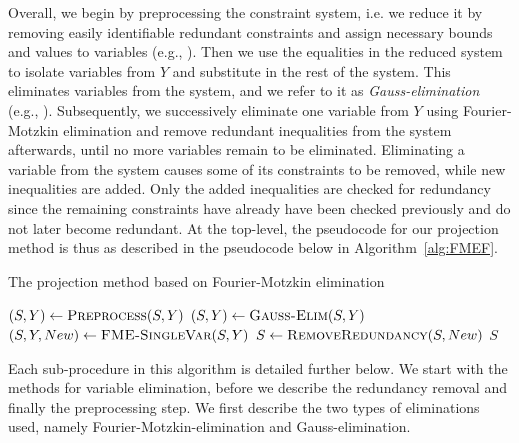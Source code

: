 Overall, we begin by preprocessing the constraint system, i.e. we reduce it by removing easily identifiable redundant constraints and assign necessary bounds and values to variables (e.g., \cite{brearley75,andersen95,maros}).
Then we use the equalities in the reduced system to isolate variables from $Y$ and substitute in the rest of the system. This eliminates variables from the system, and we refer to it as \emph{Gauss-elimination} (e.g., \cite{duffin74,simon05}).  
Subsequently, we successively eliminate one variable from $Y$ using Fourier-Motzkin elimination and remove redundant inequalities from the system afterwards, until no more variables remain to be eliminated. Eliminating a variable from the system causes some of its constraints to be removed, while new inequalities are added. Only the added inequalities are checked for redundancy since the remaining constraints have already have been checked previously and do not later become redundant. At the top-level, the pseudocode for our projection method is thus as described in the pseudocode below in Algorithm~\ref{alg:FMEF}. 
\begin{algorithm}
\caption{The projection method based on Fourier-Motzkin elimination} 
\label{alg:FMEF}
\begin{algorithmic}
	\State $(S,Y)\gets \Call{Preprocess}{S,Y}$
	\State $(S,Y)\gets\Call{Gauss-Elim}{S,Y}$
		\State $(S, Y, New )\gets\Call{FME-SingleVar}{S,Y}$
		\State $S\gets\Call{RemoveRedundancy}{S,New}$
	\EndWhile
	\State \Return $S$
\EndFunction
\end{algorithmic}
\end{algorithm}
Each sub-procedure in this algorithm is detailed further below. We start with the methods for variable elimination, before we describe the redundancy removal and finally the preprocessing step. We first describe the two types of eliminations used, namely Fourier-Motzkin-elimination and Gauss-elimination. 

